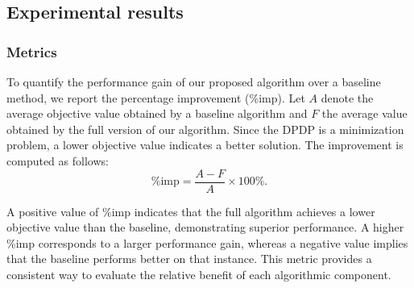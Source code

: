 \documentclass[preprint,12pt]{elsarticle}
\begin{document}





\subsection{Experimental results}
\subsubsection{Metrics}
To quantify the performance gain of our proposed algorithm over a baseline method, we report the percentage improvement (\%imp). Let $A$ denote the average objective value obtained by a baseline algorithm and $F$ the average value obtained by the full version of our algorithm. Since the DPDP is a minimization problem, a lower objective value indicates a better solution. The improvement is computed as follows:
\[
\text{\%imp} = \frac{A - F}{A} \times 100\%.
\]

A positive value of \%imp indicates that the full algorithm achieves a lower objective value than the baseline, demonstrating superior performance. A higher \%imp corresponds to a larger performance gain, whereas a negative value implies that the baseline performs better on that instance. This metric provides a consistent way to evaluate the relative benefit of each algorithmic component.
\end{document}
